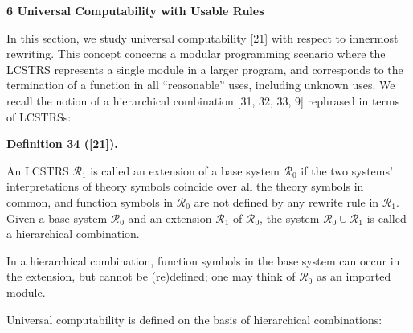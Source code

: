  
 


 
\par\medskip\noindent\textbf{6 Universal Computability with Usable Rules}\par
 
 
In this section, we study universal computability [21] with respect to innermost rewriting. This concept concerns a modular programming scenario where the LCSTRS represents a single module in a larger program, and corresponds to the termination of a function in all “reasonable” uses, including unknown uses. We recall the notion of a hierarchical combination [31, 32, 33, 9] rephrased in terms of LCSTRSs:\par
 
 
 
\par\medskip\noindent\textbf{Definition 34 ([21]).}\par
 
 
An LCSTRS $\mathcal{R}_{1}$ is called an extension of a base system $\mathcal{R}_{0}$ if the two systems’ interpretations of theory symbols coincide over all the theory symbols in common, and function symbols in $\mathcal{R}_{0}$ are not defined by any rewrite rule in $\mathcal{R}_{1}$. Given a base system $\mathcal{R}_{0}$ and an extension $\mathcal{R}_{1}$ of $\mathcal{R}_{0}$, the system $\mathcal{R}_{0}\cup\mathcal{R}_{1}$ is called a hierarchical combination.\par
 
 
 
 
In a hierarchical combination, function symbols in the base system can occur in the extension, but cannot be (re)defined; one may think of $\mathcal{R}_{0}$ as an imported module.\par
 
 
 
Universal computability is defined on the basis of hierarchical combinations:\par
 
